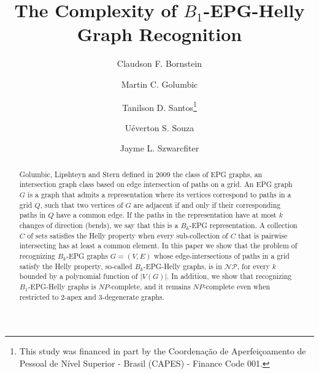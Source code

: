 \documentclass[runningheads]{llncs}
\begin{document}
%
\title{The Complexity of $B_{1}$-EPG-Helly Graph Recognition}
%
%
\author{Claudson F.  Bornstein \and
Martin C. Golumbic  \and
Tanilson D. Santos\thanks{This study was financed in part by the Coordena{\c c}\~ao de Aperfei{\c c}oamento de Pessoal de N\'ivel Superior - Brasil (CAPES) - Finance Code 001.} \and 
U\'everton S. Souza \and
Jayme L.  Szwarcfiter
}
%
%

%
\maketitle              %
%
\begin{abstract}

Golumbic, Lipshteyn and Stern defined in 2009 the class of EPG graphs, an intersection graph class  based on edge intersection of paths on a grid. An EPG graph $G$ is a graph that admits a representation where its vertices correspond to paths in a grid $Q$, such that two vertices of $G$ are adjacent if and only if their corresponding paths in $Q$ have a common edge. If the paths in the representation have at most $k$ changes of direction  (bends), we say that this is a  $B_k$-EPG representation. A collection $C$ of sets satisfies the Helly property when every sub-collection of $C$ that is pairwise intersecting has at least a common element. 
In this paper we show that the problem of recognizing $B_k$-EPG graphs $G=(V,E)$ whose edge-intersections of paths in a grid satisfy the Helly property, so-called $B_k$-EPG-Helly graphs, is in $\mathcal{NP}$, for every $k$ bounded by a polynomial function of $|V(G)|$. In addition, we show that recognizing $B_1$-EPG-Helly graphs is $NP$-complete, and it remains $NP$-complete even when restricted to 2-apex and 3-degenerate graphs.

\end{abstract}
%
%
%
\end{document}
